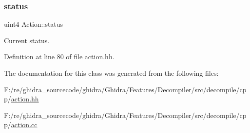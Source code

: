 \subsubsection{\texorpdfstring{status}{status}}
{\footnotesize\ttfamily uint4 Action\+::status\hspace{0.3cm}{\ttfamily [protected]}}



Current status. 



Definition at line 80 of file action.\+hh.



The documentation for this class was generated from the following files\+:\begin{DoxyCompactItemize}
\item 
F\+:/re/ghidra\+\_\+sourcecode/ghidra/\+Ghidra/\+Features/\+Decompiler/src/decompile/cpp/\mbox{\hyperlink{action_8hh}{action.\+hh}}\item 
F\+:/re/ghidra\+\_\+sourcecode/ghidra/\+Ghidra/\+Features/\+Decompiler/src/decompile/cpp/\mbox{\hyperlink{action_8cc}{action.\+cc}}\end{DoxyCompactItemize}

